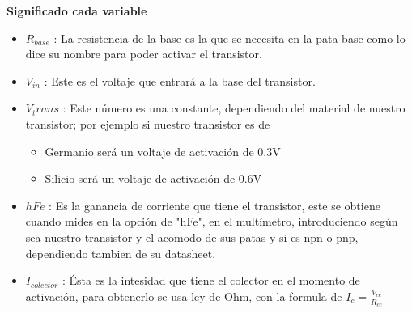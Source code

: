 \documentclass[letterpaper]{article}
\begin{document}
\begin{large}
	\textbf{Significado cada variable}\\
\end{large}
	\begin{itemize}
		\item $R_{base}$ : La resistencia de la base es la que se necesita en la pata base como lo dice su nombre para poder activar el transistor.
		\item $V_{in}$ : Este es el voltaje que entrará a la base del transistor. 
		\item $V_trans$ : Este número es una constante, dependiendo del material de nuestro transistor; por ejemplo si nuestro transistor es de 
		\begin{itemize}
		\item Germanio será un voltaje de activación de 0.3V
		\item Silicio será un voltaje de activación de 0.6V
		\end{itemize}
		\item $hFe$ : Es la ganancia de corriente que tiene el transistor, este se obtiene cuando mides en la opción de "hFe", en el multímetro, introduciendo según sea nuestro transistor y el acomodo de sus patas y si es npn o pnp, dependiendo tambien de su datasheet.
		\item $I_{colector}$ : Ésta es la intesidad que tiene el colector en el momento de activación, para obtenerlo se usa ley de Ohm, con la formula de $I_c= \frac{V_{cc}}{R_{cc}}$
	\end{itemize}
\end{document}

